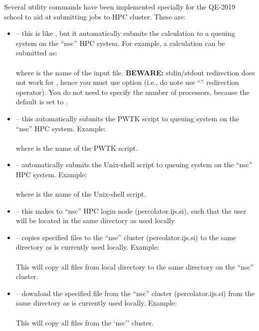 \documentclass[landscape]{foils}
\begin{document}
Several utility commands have been implemented specially for the
QE-2019 school to aid at submitting jobs to HPC cluster. These are:
{\small
\begin{itemize}
\item {} -- this is like , but it
  automatically submits the calculation to a queuing system on the
  ``nsc'' HPC system. For example, a  calculation can be
  submitted
  as:\\[0.5em]
  \\[0.5em]
  where  is the name of the  input
  file. {\bf BEWARE:} stdin/stdout redirection does not work for
  , hence you must use  option (i.e.,
  do note use ``\cmd{<}'' redirection operator). You do not need to
  specify the number of processors, because the default is set to
  .
  \vspace{0.5em}
\item {} -- this automatically submits the PWTK
  script to queuing system on the ``nsc'' HPC system. Example:\\[0.5em]
  \\[0.5em]
  where  is the name of the PWTK script.
\vspace{0.5em}
\item {} -- automatically submits the Unix-shell
  script to queuing system on the ``nsc''  HPC system. Example:\\[0.5em]
  \\[0.5em]
  where  is the name of the Unix-shell script.
  
\clearpage
\item {} -- this makes  to ``nsc'' HPC login node
  (percolator.ijs.si), such that the user will be located in the same
  directory as used locally
\vspace{0.5em}
\item {} -- copies specified files to the ``nsc''
  cluster (percolator.ijs.si) to the same directory as is currently
  used locally. Example:\\[0.5em]
  \\[0.5em]
  This will copy all  files from local directory to the
  same directory on the ``nsc'' cluster.
\vspace{0.5em}  
\item {} -- download the specified file from the
  ``nsc'' cluster (percolator.ijs.si) from the same directory as is
  currently used locally. Example:\\[0.5em]
  \\[0.5em]
  This will copy all  files from the `nsc'' cluster.
\end{itemize}
}
\rightheader{}
\end{document}
